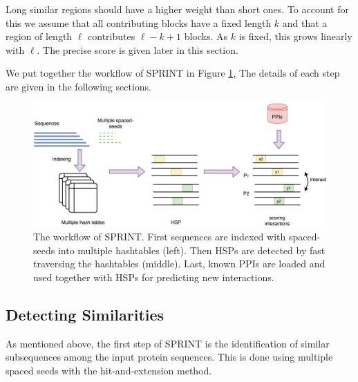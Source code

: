 
Long similar regions should have a higher weight than short ones. To account for this we assume that all contributing blocks have a fixed length $k$ %
and that a region of length $\ell$ contributes $\ell-k+1$ blocks. As $k$ is fixed, this grows linearly with $\ell$. The precise score is given later in this section.

We put together the workflow of SPRINT in Figure \ref{fig_SPRINT_workflow}, The details of each step are given in the following sections.

\begin{figure}[h!]
\centering
\includegraphics[width=15cm]{img/SPRINT_workflow.png}
\caption[The workflow of SPRINT]{The workflow of SPRINT. First sequences are indexed with spaced-seeds into multiple hashtables (left). Then HSPs are detected by fast traversing the hashtables (middle). Last, known PPIs are loaded and used together with HSPs for predicting new interactions. \label{fig_SPRINT_workflow}}
\end{figure}

\subsection{Detecting Similarities \label{sec_detect_simi}}
As mentioned above, the first step of SPRINT is the identification of similar subsequences among the input protein sequences. This is done using multiple spaced seeds with the hit-and-extension method.

